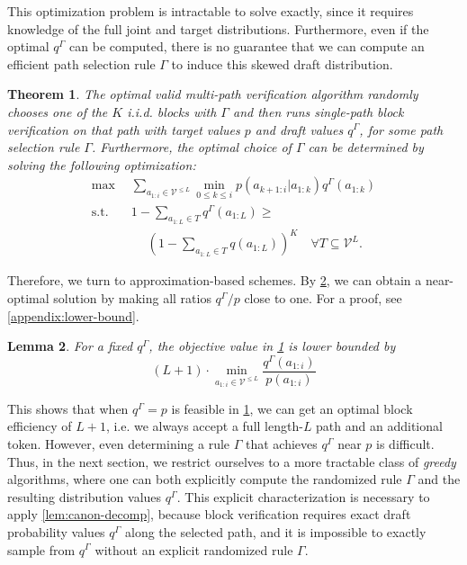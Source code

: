 \documentclass{article}
\theoremstyle{plain}
\newtheorem{theorem}{Theorem}[section]
\newtheorem{lemma}[theorem]{Lemma}
\theoremstyle{definition}
\theoremstyle{remark}
\newcommand{\V}{\mathcal{V}}
\begin{document}
This optimization problem is intractable to solve exactly, since it requires knowledge of the full joint and target distributions. Furthermore, even if the optimal $q^\Gamma$ can be computed, there is no guarantee that we can compute an efficient path selection rule $\Gamma$ to induce this skewed draft distribution.

\begin{theorem}
    The optimal valid multi-path verification algorithm randomly chooses one of the $K$ i.i.d. blocks with $\Gamma$ and then runs single-path block verification on that path with target values $p$ and draft values $q^\Gamma$, for some path selection rule $\Gamma$. Furthermore, the optimal choice of $\Gamma$ can be determined by solving the following optimization:
    \begin{align}
    \max &\sum_{a_{1:i} \in \V^{\leq L}} \min_{0 \leq k \leq i} p(a_{k+1:i}|a_{1:k})q^\Gamma(a_{1:k}) \\
    \text{s.t.}\quad& 1 - \sum_{a_{1:L} \in T} q^\Gamma(a_{1:L}) \geq \\
    & \quad \; \left(1-\sum_{a_{1:L} \in T} q(a_{1:L})\right)^K \quad \forall T \subseteq \V^L.
    \end{align}
    \label{thm:opt-multipath}
\end{theorem}

 Therefore, we turn to approximation-based schemes. By \cref{lem:lower-bound}, we can obtain a near-optimal solution by making all ratios $q^\Gamma/p$ close to one. For a proof, see \cref{appendix:lower-bound}.

\begin{lemma}
    For a fixed $q^\Gamma$, the objective value in \cref{thm:opt-multipath} is lower bounded by 
    \begin{equation}
        (L+1)\cdot \min_{a_{1:i} \in \V^{\leq L}} \frac{q^\Gamma(a_{1:i})}{p(a_{1:i})}
    \end{equation}
    \label{lem:lower-bound}
\end{lemma}
This shows that when $q^\Gamma=p$ is feasible in \cref{thm:opt-multipath}, we can get an optimal block efficiency of $L+1$, i.e. we always accept a full length-$L$ path and an additional token. However, even determining a rule $\Gamma$ that achieves $q^\Gamma$ near $p$ is difficult. Thus, in the next section, we restrict ourselves to a more tractable class of \textit{greedy} algorithms, where one can both explicitly compute the randomized rule $\Gamma$ and the resulting distribution values $q^\Gamma$. This explicit characterization is necessary to apply \cref{lem:canon-decomp}, because block verification requires exact draft probability values $q^\Gamma$ along the selected path, and it is impossible to exactly sample from $q^\Gamma$ without an explicit randomized rule $\Gamma$.
\end{document}
